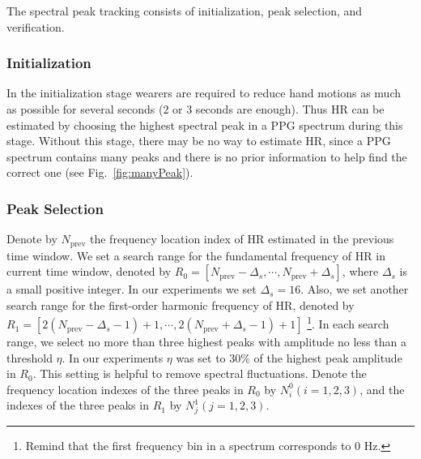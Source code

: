 \documentclass[10pt,twocolumn]{IEEEtran}
\begin{document}
The spectral peak tracking consists of initialization, peak selection, and verification.


\subsubsection{Initialization}

In the initialization stage wearers are required to reduce hand motions as much as possible for several seconds (2 or 3 seconds are enough). Thus HR can be estimated by choosing the highest spectral peak in a PPG spectrum during this stage. Without this stage, there may be no way to estimate HR, since a PPG spectrum contains many peaks and there is no prior information to help find the correct one (see Fig.~\ref{fig:manyPeak}).


\subsubsection{Peak Selection}
\label{subsubsec:peakSelection}

Denote by $N_{\mathrm{prev}}$ the frequency location index of HR estimated in the previous time window. We set a search range for the fundamental frequency of HR in current time window, denoted by $R_0 = [ N_{\mathrm{prev}}-\Delta_s, \cdots, N_{\mathrm{prev}}+\Delta_s]$, where $\Delta_s$ is a small positive integer. In our experiments we set $\Delta_s = 16$. Also, we set another search range for the first-order harmonic frequency of HR, denoted by $R_1 = [ 2(N_{\mathrm{prev}}-\Delta_s-1)+1, \cdots,   2(N_{\mathrm{prev}}+\Delta_s-1)+1 ]$ \footnote{Remind that the first frequency bin in a spectrum corresponds to 0 Hz.}. In each search range, we select no more than three highest peaks with amplitude no less than a threshold $\eta$. In our experiments $\eta$ was set to 30\% of the highest peak amplitude in $R_0$. This setting is helpful to remove spectral fluctuations. Denote the frequency location indexes of the three peaks in $R_0$ by $N_i^0 (i=1,2,3)$, and the indexes of the three peaks in $R_1$ by $N_j^1 (j=1,2,3)$.
\end{document}

